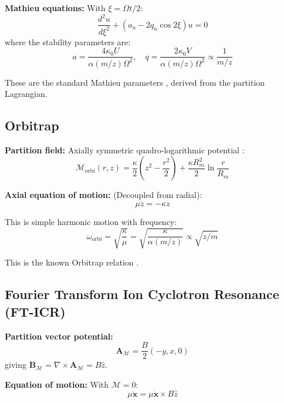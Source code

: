 \documentclass[twocolumn,10pt,a4paper]{article}
\theoremstyle{definition}
\theoremstyle{remark}
\newcommand{\Depth}{\mathcal{M}}
\newcommand{\Apartition}{\mathbf{A}_{\mathcal{M}}}
\newcommand{\partinert}{\mu}
\begin{document}
\textbf{Mathieu equations:} With $\xi = \Omega t/2$:
\begin{equation}
    \frac{d^2u}{d\xi^2} + (a_u - 2q_u\cos 2\xi)u = 0
\end{equation}
where the stability parameters are:
\begin{equation}
    \boxed{a = \frac{4\kappa_0 U}{\alpha(m/z)\Omega^2}, \quad q = \frac{2\kappa_0 V}{\alpha(m/z)\Omega^2} \propto \frac{1}{m/z}}
\end{equation}

These are the standard Mathieu parameters \citep{paul1990,march2005}, derived from the partition Lagrangian.

\subsection{Orbitrap}

\textbf{Partition field:} Axially symmetric quadro-logarithmic potential \citep{makarov2000}:
\begin{equation}
    \Depth_{\text{orbi}}(r, z) = \frac{\kappa}{2}\left(z^2 - \frac{r^2}{2}\right) + \frac{\kappa R_m^2}{2}\ln\frac{r}{R_m}
\end{equation}

\textbf{Axial equation of motion:} (Decoupled from radial):
\begin{equation}
    \partinert\ddot{z} = -\kappa z
\end{equation}

This is simple harmonic motion with frequency:
\begin{equation}
    \boxed{\omega_{\text{orbi}} = \sqrt{\frac{\kappa}{\partinert}} = \sqrt{\frac{\kappa}{\alpha(m/z)}} \propto \sqrt{z/m}}
\end{equation}

This is the known Orbitrap relation \citep{makarov2000}.

\subsection{Fourier Transform Ion Cyclotron Resonance (FT-ICR)}

\textbf{Partition vector potential:}
\begin{equation}
    \Apartition = \frac{B}{2}(-y, x, 0)
\end{equation}
giving $\mathbf{B}_{\Depth} = \nabla \times \Apartition = B\hat{z}$.

\textbf{Equation of motion:} With $\Depth = 0$:
\begin{equation}
    \partinert\ddot{\mathbf{x}} = \partinert\dot{\mathbf{x}} \times B\hat{z}
\end{equation}
\end{document}
